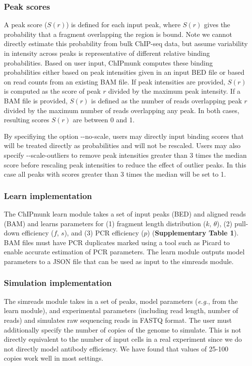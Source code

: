 \documentclass[12pt]{article}
\begin{document}
\subsubsection*{Peak scores}
A peak score ($S(r)$) is defined for each input peak, where $S(r)$ gives the probability that a fragment overlapping the region is bound.
Note we cannot directly estimate this probability from bulk ChIP-seq data, but assume variability in intensity across peaks is representative of different relative binding probabilities.
Based on user input, ChIPmunk computes these binding probabilities either based on peak intensities given in an input BED file or based on read counts from an existing BAM file.
If peak intensities are provided, $S(r)$ is computed as the score of peak $r$ divided by the maximum peak intensity.
If a BAM file is provided, $S(r)$ is defined as the number of reads overlapping peak $r$ divided by the maximum number of reads overlapping any peak.
In both cases, resulting scores $S(r)$ are between 0 and 1.

By specifiying the option -{}-no-scale, users may directly input binding scores that will be treated directly as probabilities and will not be rescaled.
Users may also specify -{}-scale-outliers to remove peak intensities greater than 3 times the median score before rescaling peak intensities to reduce the effect of outlier peaks. In this case all peaks with scores greater than 3 times the median will be set to 1.

\subsubsection*{Learn implementation}
The ChIPmunk learn module takes a set of input peaks (BED) and aligned reads (BAM) and learns parameters for (1) fragment length distribution ($k$, $\theta$), (2) pull-down efficiency ($f$, $s$), and (3) PCR efficiency ($p$) (\textbf{Supplementary Table 1}).
BAM files must have PCR duplicates marked using a tool such as Picard \cite{picard} to enable accurate estimation of PCR parameters.
The learn module  outputs model parameters to a JSON file that can be used as input to the simreads module.

\subsubsection*{Simulation implementation}

The simreads module takes in a set of peaks, model parameters (\emph{e.g.}, from the learn module), and experimental parameters (including read length, number of reads) and simulates raw sequencing reads in FASTQ format.
The user must additionally specify the number of copies of the genome to simulate. This is not directly equivalent to the number of input cells in a real experiment since we do not directly model antibody efficiency. We have found that values of 25-100 copies work well in most settings.
\end{document}
